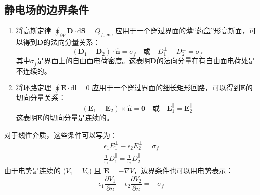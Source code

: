 \documentclass[fontset=none]{ctexart}
\begin{document}
\subsection{静电场的边界条件}
\begin{enumerate}
    \item 将高斯定律 $\oint_{\partial V} \bm{D} \cdot \mathrm{d}\bm{S} = Q_{f, \text{enc}}$ 应用于一个穿过界面的薄“药盒”形高斯面，可以得到$\bm{D}$的法向分量关系：
    \begin{equation}
        (\bm{D}_1 - \bm{D}_2) \cdot \hat{\bm{n}} = \sigma_f \quad \text{或} \quad D_{1}^{\perp} - D_{2}^{\perp} = \sigma_f
    \end{equation}
    其中$\sigma_f$是界面上的自由面电荷密度。这表明$\bm{D}$的法向分量在有自由面电荷处是不连续的。
    \item 将环路定理 $\oint \bm{E} \cdot \mathrm{d}\bm{l} = 0$ 应用于一个穿过界面的细长矩形回路，可以得到$\bm{E}$的切向分量关系：
    \begin{equation}
        (\bm{E}_1 - \bm{E}_2) \times \hat{\bm{n}} = \bm{0} \quad \text{或} \quad \bm{E}_{1}^{\parallel} = \bm{E}_{2}^{\parallel}
    \end{equation}
    这表明$\bm{E}$的切向分量是连续的。
\end{enumerate}
对于线性介质，这些条件可以写为：
\begin{gather}
    \epsilon_1 E_{1}^{\perp} - \epsilon_2 E_{2}^{\perp} = \sigma_f \\
    \frac{1}{\epsilon_1}D_{1}^{\parallel} = \frac{1}{\epsilon_2}D_{2}^{\parallel}
\end{gather}
由于电势是连续的 ($V_1 = V_2$) 且 $\bm{E} = -\nabla V$，边界条件也可以用电势表示：
\begin{equation}
    \epsilon_1 \frac{\partial V_1}{\partial n} - \epsilon_2 \frac{\partial V_2}{\partial n} = -\sigma_f
\end{equation}
\end{document}
